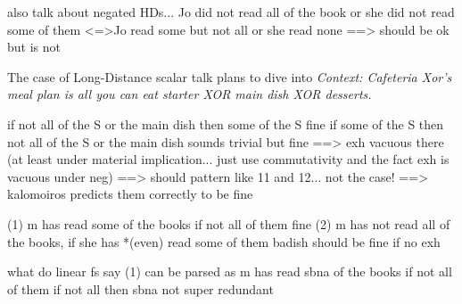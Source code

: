 	
	
	
	
	\iffalse
	
	\ex.[\Vref{ex:hd-s}{$'$}]
	\a.{Jo read (only) \textcolor{blue}{some} (but not all) or \textcolor{orange}{all} of the books.}\label{ex:hd-scalar-w-s-repaired}
	\b.{Jo read \textcolor{orange}{all} or ${}^\#$(only) \textcolor{blue}{some} ${}^\#$(but not all) of the books.}\label{ex:hcd-scalar-s-w-repaired}
	
	\ex.[\Vref{ex:hc-s}{$'$}]
	\a.{If Jo read (${}^\#$only) \textcolor{blue}{some} (${}^\#$but not all) of the books she hasn't read \textcolor{orange}{all}.}\label{ex:hc-scalar-w-ns-repaired}
	\b.{If Jo hasn't read \textcolor{orange}{all} of the books she's read (${}^\#$only) \textcolor{blue}{some} (${}^\#$but not all).}\label{ex:hc-scalar-ns-w-repaired}
	
	\fi
	
	
	

	
	also talk about negated HDs...
	Jo did not read all of the book or she did not read some of them
	<=>Jo read some but not all or she read none
	==> should be ok but is not
	
	
	The case of Long-Distance scalar  talk plans to dive into
	\noindent\textit{Context: Cafeteria Xor's meal plan is all you can eat starter XOR main dish XOR desserts.}
	\begin{exe}
	\end{exe}
	
	if not all of the S or the main dish then some of the S fine
	if some of the S then not all of the S or the main dish sounds trivial but fine
	==> exh vacuous there (at least under material implication... just use commutativity and the fact exh is vacuous under neg)
	==> should pattern like 11 and 12... not the case!
	==> kalomoiros predicts them correctly to be fine
	
	
	(1) m has read some of the books if not all of them fine 
	(2) m has not read all of the books, if she has *(even) read some of them badish should be fine if no exh
	
	what do linear fs say
	(1) can be parsed as
	m has read sbna of the books if not all of them
	if not all then sbna not super redundant
	
